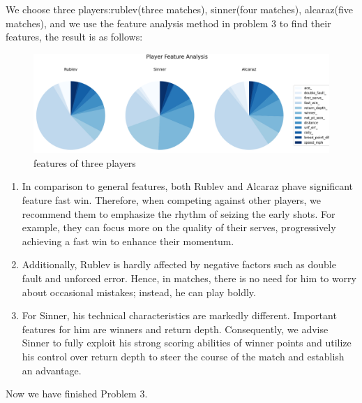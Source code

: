 We choose three players:rublev(three matches), sinner(four matches), alcaraz(five matches), and 
we use the feature analysis method in problem 3 to find their features, the result is as follows:
\begin{figure}[H]
    \centering
    \includegraphics[scale=0.4]{mainmatter/imgs/9.png}
    \caption{features of three players}
\end{figure}
\begin{enumerate}
    \item In comparison to general features, both Rublev and Alcaraz phave significant feature fast win. 
    Therefore, when competing against other players, we recommend them to emphasize the rhythm of seizing 
    the early shots. For example, they can focus more on the quality of their serves, 
    progressively achieving a fast win to enhance their momentum. 
    \item Additionally, Rublev is hardly affected by negative factors such as double fault and 
    unforced error. Hence, in matches, there is no need for him to worry about occasional mistakes; 
    instead, he can play boldly.
    \item For Sinner, his technical characteristics are markedly different. 
    Important features for him are winners and return depth. Consequently, 
    we advise Sinner to fully exploit his strong scoring abilities of winner points
    and utilize his control over return depth to steer the course of the match and establish an advantage.

\end{enumerate}

Now we have finished Problem 3.